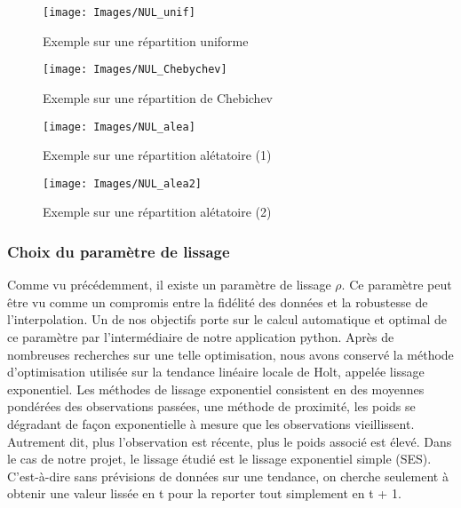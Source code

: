 \documentclass[a4paper,12pt]{article} %
\begin{document}
                \begin{figure}
                \begin{center}
                \texttt{[image: Images/NUL\_unif]} 
                \end{center}
                \caption{Exemple sur une répartition uniforme}
                \label{NUL1}
                \end{figure}
                
                \begin{figure}
                \begin{center}
                \texttt{[image: Images/NUL\_Chebychev]} 
                \end{center}
                \caption{Exemple sur une répartition de Chebichev}
                \label{NUL2}
                \end{figure}
                
                \begin{figure}
                \begin{center}
                \texttt{[image: Images/NUL\_alea]} 
                \end{center}
                \caption{Exemple sur une répartition alétatoire (1)}
                \label{NUL3}
                \end{figure}
                
                
                \begin{figure}
                \begin{center}
                \texttt{[image: Images/NUL\_alea2]} 
                \end{center}
                \caption{Exemple sur une répartition alétatoire (2)}
                \label{NUL4}
                \end{figure}
                

			\subsubsection{Choix du paramètre de lissage}
                Comme vu précédemment, il existe un paramètre de lissage $\rho$. Ce paramètre peut être vu comme un compromis entre la fidélité des données et la robustesse de l'interpolation. Un de nos objectifs porte sur le calcul automatique et optimal de ce paramètre par l'intermédiaire de notre application python.
                Après de nombreuses recherches sur une telle optimisation, nous avons conservé la méthode d'optimisation utilisée sur la tendance linéaire locale de Holt, appelée lissage exponentiel. 
                Les méthodes de lissage exponentiel consistent en des moyennes pondérées des observations passées, une méthode de proximité, les poids se dégradant de façon exponentielle à mesure que les observations vieillissent. Autrement dit, plus l’observation est récente, plus le poids associé est élevé. 
                Dans le cas de notre projet, le lissage étudié est le lissage exponentiel simple (SES). C'est-à-dire sans prévisions de données sur une tendance, on cherche seulement à obtenir une valeur lissée en t pour la reporter tout simplement en t + 1.
                
\end{document}
